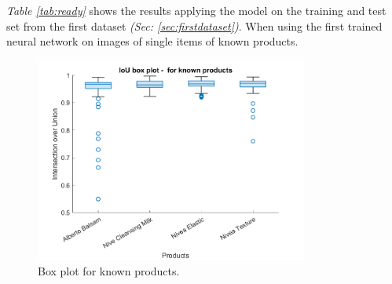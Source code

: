 \begin{table}[h]
\caption{Detection results when tested on the training and test set from the first dataset (\textit{Sec: \ref{sec:firstdataset}}) using the first neural network.}
\label{tab:ready}
\end{table}

\textit{Table \ref{tab:ready}} shows the results applying the model on the training and test set from the first dataset \textit{(Sec: \ref{sec:firstdataset})}. When using the first trained neural network on images of single items of known products.
\clearpage

\begin{figure}[h]
 \centering
 \includegraphics[width=0.8\textwidth]{graphics/results/boxplotForKnownProducts.png}
 \caption{Box plot for known products.}
 \label{fig:boxknownproducts}
\end{figure}

